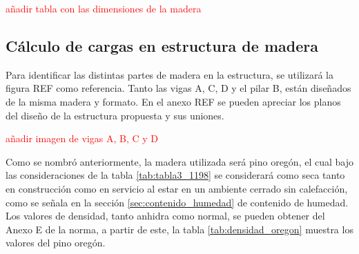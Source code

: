 \textcolor{red}{añadir tabla con las dimensiones de la madera}

\subsection{Cálculo de cargas en estructura de madera}
Para identificar las distintas partes de madera en la estructura, se utilizará la figura REF como referencia. Tanto las vigas A, C, D y el pilar B, están diseñados de la misma madera y formato. En el anexo REF se pueden apreciar los planos del diseño de la estructura propuesta y sus uniones.

\textcolor{red}{añadir imagen de vigas A, B, C y D}

Como se nombró anteriormente, la madera utilizada será pino oregón, el cual bajo las consideraciones de la tabla \ref{tab:tabla3_1198} se considerará como seca tanto en construcción como en servicio al estar en un ambiente cerrado sin calefacción, como se señala en la sección \ref{sec:contenido_humedad} de contenido de humedad. Los valores de densidad, tanto anhidra como normal, se pueden obtener del Anexo E de la norma, a partir de este, la tabla \ref{tab:densidad_oregon} muestra los valores del pino oregón.

